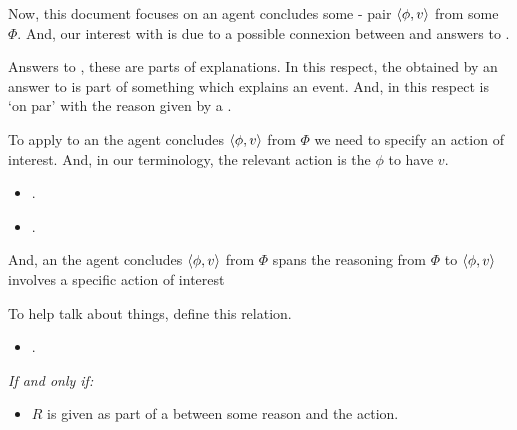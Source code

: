 \begin{note}
  Now, this document focuses on \eiw{} an agent concludes some - pair \(\langle\phi, v\rangle\) from some \pool{} \(\Phi\).
  And, our interest with  is due to a possible connexion between \rationalisation{} and answers to \qWhy{}.

  Answers to \qWhy{}, these are parts of explanations.
  In this respect, the \fingfr{} obtained by an answer to \qWhy{} is part of something which explains an event.
  And, in this respect is `on par' with the \agents{} reason given by a .




  
  To apply  to an \eiw{} the agent concludes \(\langle\phi, v\rangle\) from \(\Phi\) we need to specify an action of interest.
  And, in our terminology, the relevant action is the \agents{} \evaling{} \(\phi\) to have  \(v\).

  \begin{itemize}
  \item
    .
  \item
    .
  \end{itemize}
  
  And, an \eiw{} the agent concludes \(\langle\phi, v\rangle\) from \(\Phi\) spans the \agents{} reasoning from \(\Phi\) to \(\langle\phi, v\rangle\) involves a specific action of interest
  
\end{note}




\begin{note}
  To help talk about things, define this relation.

  \begin{definition}[\motingr{3}]%
    \label{def:motingRels}%
    \vspace{-\baselineskip}
    \begin{itemize}
    \item
      .
    \end{itemize}

    \emph{If and only if:}

    \begin{itemize}
    \item
      \(R\) is given as part of a  between some reason and the action.
    \end{itemize}
    \vspace{-\baselineskip}
  \end{definition}
\end{note}


